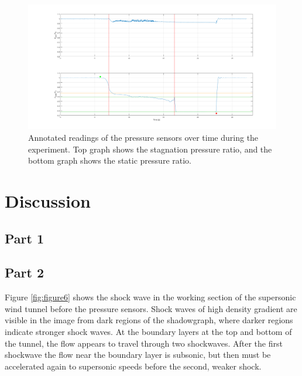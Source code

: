 \documentclass{article}
\begin{document}
\begin{figure}[H]
    \centering
    \includegraphics[width=1\textwidth]{../Supersonic_Nozzle/tunnel_pressures_annotated.png}
    \caption{Annotated readings of the pressure sensors over time during the experiment. Top graph shows the stagnation pressure ratio, and the bottom graph shows the static pressure ratio.}
    \label{fig:figure8}
\end{figure}

\section{Discussion}

\subsection{Part 1}




\subsection{Part 2}

Figure \ref{fig:figure6} shows the shock wave in the working section of the supersonic wind tunnel before the pressure sensors.
Shock waves of high density gradient are visible in the image from dark regions of the shadowgraph, where darker regions indicate stronger shock waves.
At the boundary layers at the top and bottom of the tunnel, the flow appears to travel through two shockwaves.
After the first shockwave the flow near the boundary layer is subsonic, but then must be accelerated again to supersonic speeds before the second, weaker shock.
\end{document}
